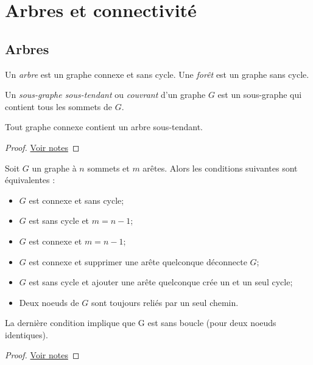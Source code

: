 \section{Arbres et connectivité}
\subsection{Arbres}
\begin{mydef}
  Un \emph{arbre} est un graphe connexe et sans cycle. Une \emph{forêt} est un graphe sans cycle.
\end{mydef}

\begin{mydef}
  Un \emph{sous-graphe sous-tendant} ou \emph{couvrant} d’un graphe $G$ est un sous-graphe qui contient tous les sommets de $G$.
\end{mydef}

\begin{mytheo}   
  Tout graphe connexe contient un arbre sous-tendant.
  \begin{proof}
     \href{https://dl.dropboxusercontent.com/u/44092863/Graph_Theory_Romain_Capron.pdf}{Voir notes}
  \end{proof}
\end{mytheo}

\begin{mytheo} 
  Soit $G$ un graphe à $n$ sommets et $m$ arêtes. Alors les conditions suivantes sont équivalentes :
  \begin{itemize}
    \item $G$ est connexe et sans cycle;
    \item $G$ est sans cycle et $m = n − 1$;
    \item $G$ est connexe et $m = n − 1$;
    \item $G$ est connexe et supprimer une arête quelconque déconnecte $G$;
    \item $G$ est sans cycle et ajouter une arête quelconque crée un et un seul cycle;
    \item Deux noeuds de $G$ sont toujours reliés par un seul chemin.
  \end{itemize}
  La dernière condition implique que G est sans boucle (pour deux noeuds identiques).
  \begin{proof}
     \href{https://dl.dropboxusercontent.com/u/44092863/Graph_Theory_Romain_Capron.pdf}{Voir notes}
  \end{proof}
\end{mytheo}

